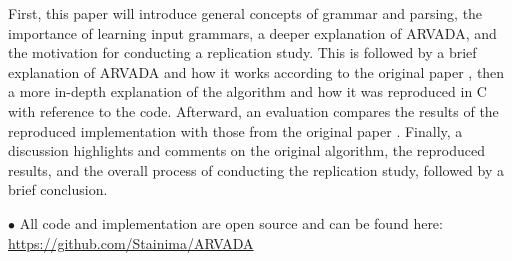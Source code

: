\vspace{\baselineskip}
First, this paper will introduce general concepts of grammar and parsing, the importance of learning input grammars, a deeper explanation of ARVADA, and the motivation for conducting a replication study. This is followed by a brief explanation of ARVADA and how it works according to the original paper \cite{kulkarniLearningHighlyRecursive2021}, then a more in-depth explanation of the algorithm and how it was reproduced in C with reference to the code. Afterward, an evaluation compares the results of the reproduced implementation with those from the original paper \cite{kulkarniLearningHighlyRecursive2021}. Finally, a discussion highlights and comments on the original algorithm, the reproduced results, and the overall process of conducting the replication study, followed by a brief conclusion.

$\bullet$ All code and implementation are open source and can be found here: \url{https://github.com/Stainima/ARVADA}